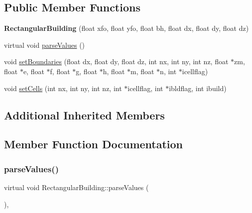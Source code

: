 \subsection*{Public Member Functions}
\begin{DoxyCompactItemize}
\item 
\mbox{\label{classRectangularBuilding_a5106fdd27a6eb098386f608e6eaf3135}} 
{\bfseries Rectangular\+Building} (float xfo, float yfo, float bh, float dx, float dy, float dz)
\item 
virtual void \hyperlink{classRectangularBuilding_adbc6b832c817fc06f9bc2e51561a7e81}{parse\+Values} ()
\item 
void \hyperlink{classRectangularBuilding_af690323c42b943b9a72ce6857b5e9ca0}{set\+Boundaries} (float dx, float dy, float dz, int nx, int ny, int nz, float $\ast$zm, float $\ast$e, float $\ast$f, float $\ast$g, float $\ast$h, float $\ast$m, float $\ast$n, int $\ast$icellflag)
\item 
void \hyperlink{classRectangularBuilding_ae2e0b496b0adf1b3e6961a42043f22c8}{set\+Cells} (int nx, int ny, int nz, int $\ast$icellflag, int $\ast$ibldflag, int ibuild)
\end{DoxyCompactItemize}
\subsection*{Additional Inherited Members}


\subsection{Member Function Documentation}
\mbox{\label{classRectangularBuilding_adbc6b832c817fc06f9bc2e51561a7e81}} 
\subsubsection{\texorpdfstring{parse\+Values()}{parseValues()}}
{\footnotesize\ttfamily virtual void Rectangular\+Building\+::parse\+Values (\begin{DoxyParamCaption}{ }\end{DoxyParamCaption})\hspace{0.3cm}{\ttfamily [inline]}, {\ttfamily [virtual]}}

